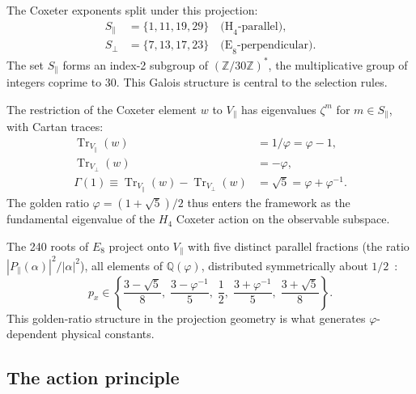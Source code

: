 \documentclass[aps,prd,twocolumn,superscriptaddress,nofootinbib,showpacs]{revtex4-2}
\newcommand{\Tr}{\operatorname{Tr}}
\begin{document}
The Coxeter exponents split under this projection:
\begin{align}
S_\parallel &= \{1, 11, 19, 29\} \quad \text{(H}_4\text{-parallel)}, \label{eq:spar} \\
S_\perp &= \{7, 13, 17, 23\} \quad \text{(E}_8\text{-perpendicular)}. \label{eq:sperp}
\end{align}
The set $S_\parallel$ forms an index-2 subgroup of
$(\mathbb{Z}/30\mathbb{Z})^*$, the multiplicative group of integers
coprime to 30.  This Galois structure is central to the selection rules.

The restriction of the Coxeter element $w$ to $V_\parallel$ has
eigenvalues $\zeta^m$ for $m \in S_\parallel$, with Cartan traces:
\begin{align}
\Tr_{V_\parallel}(w) &= 1/\varphi = \varphi - 1, \label{eq:trpar} \\
\Tr_{V_\perp}(w) &= -\varphi, \label{eq:trperp} \\
\Gamma(1) \equiv \Tr_{V_\parallel}(w) - \Tr_{V_\perp}(w) &= \sqrt{5} = \varphi + \varphi^{-1}. \label{eq:gamma}
\end{align}
The golden ratio $\varphi = (1+\sqrt{5})/2$ thus enters the framework
as the fundamental eigenvalue of the $H_4$ Coxeter action on the
observable subspace.

The 240 roots of $E_8$ project onto $V_\parallel$ with five distinct
parallel fractions (the ratio $|P_\parallel(\alpha)|^2/|\alpha|^2$),
all elements of $\mathbb{Q}(\varphi)$, distributed symmetrically
about $1/2$~\cite{ElserSloane}:
\begin{equation}
p_x \in \left\{\frac{3-\sqrt{5}}{8},\; \frac{3-\varphi^{-1}}{5},\;
\frac{1}{2},\; \frac{3+\varphi^{-1}}{5},\; \frac{3+\sqrt{5}}{8}\right\}.
\label{eq:projfracs}
\end{equation}
This golden-ratio structure in the projection geometry is what
generates $\varphi$-dependent physical constants.

\subsection{The action principle}\label{sec:action}
\end{document}
